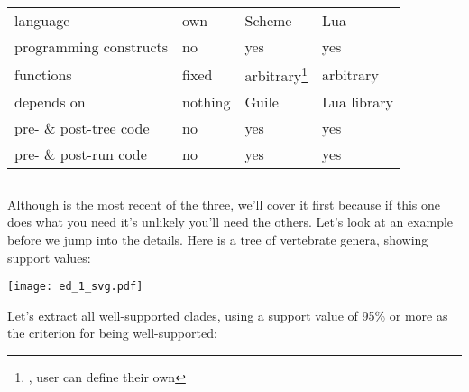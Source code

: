 \begin{center}
	\begin{minipage}{0.8\textwidth}
		\begin{tabular}{llll}
		& \ed & \sched & \luaed \\
		\hline
		language & own & Scheme & Lua \\
		programming constructs & no & yes & yes \\
		functions & fixed & arbitrary\footnote{\ie, user can define their own} & arbitrary \\
		depends on & nothing & \gnu{} Guile & Lua library \\
		pre- \& post-tree code & no & yes & yes \\
		pre- \& post-run code & no & yes & yes
		\end{tabular}
	\end{minipage}
\end{center}

\subsection{\luaed}

Although \luaed{} is the most recent of the three, we'll cover it first because
if this one does what you need it's unlikely you'll need the others.  Let's look
at an example before we jump into the details. Here is a tree of vertebrate
genera, showing support values:


\begin{center}
\texttt{[image: ed\_1\_svg.pdf]}
\end{center}

\noindent{}Let's extract all well-supported clades, using a support value of 95\% or more as the criterion for being well-supported:


\begin{samepage}

\end{samepage}

